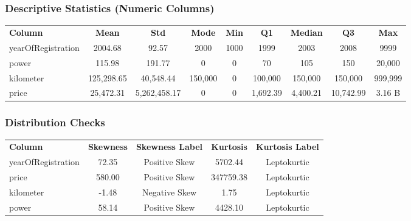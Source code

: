\documentclass[12pt, a4paper]{article}
\begin{document}
\subsubsection{Descriptive Statistics (Numeric Columns)}
\vspace{0.25cm}
\begin{center}
\renewcommand{\arraystretch}{1.4}
\begin{tabular}{@{}l c c c c c c c c@{}}
\rowcolor{slate}
{\color{white}\small\bfseries Column} &
{\color{white}\small\bfseries Mean} &
{\color{white}\small\bfseries Std} &
{\color{white}\small\bfseries Mode} &
{\color{white}\small\bfseries Min} &
{\color{white}\small\bfseries Q1} &
{\color{white}\small\bfseries Median} &
{\color{white}\small\bfseries Q3} &
{\color{white}\small\bfseries Max}
 \\

\rowcolor{lightgray}
yearOfRegistration & 2004.68 & 92.57 & 2000 & 1000 & 1999 & 2003 & 2008 & 9999 \\

\rowcolor{white}
power & 115.98 & 191.77 & 0 & 0 & 70 & 105 & 150 & 20,000 \\

\rowcolor{lightgray}
kilometer & 125,298.65 & 40,548.44 & 150,000 & 0 & 100,000 & 150,000 & 150,000 & 999,999 \\

\rowcolor{white}
price & 25,472.31 & 5,262,458.17 & 0 & 0 & 1,692.39 & 4,400.21 & 10,742.99 & 3.16 B \\
\end{tabular}
\end{center}

\vspace{0.25cm}
\subsubsection{Distribution Checks}

\begin{center}
\renewcommand{\arraystretch}{1.4}
\begin{tabular}{l c c c c}
\rowcolor{slate}
{\color{white}\small\bfseries Column} &
{\color{white}\small\bfseries Skewness} &
{\color{white}\small\bfseries Skewness Label} &
{\color{white}\small\bfseries Kurtosis} &
{\color{white}\small\bfseries Kurtosis Label} \\
\rowcolor{lightgray} yearOfRegistration & 72.35 & Positive Skew & 5702.44 & Leptokurtic \\
\rowcolor{white} price & 580.00 & Positive Skew & 347759.38 & Leptokurtic \\
\rowcolor{lightgray} kilometer & -1.48 & Negative Skew & 1.75 & Leptokurtic \\
\rowcolor{white} power & 58.14 & Positive Skew & 4428.10 & Leptokurtic \\
\end{tabular}
\end{center}
\end{document}
